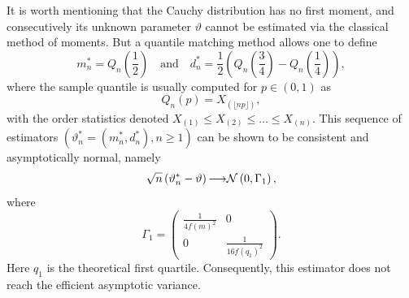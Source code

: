It is worth mentioning that the Cauchy distribution has no first moment, and consecutively its unknown parameter $\vartheta$ cannot be estimated via the classical method of moments. But a quantile matching method allows one to define
\begin{equation}
m^*_{n} = Q_n \left(\frac{1}{2}\right) \quad  \mbox{and} \quad d^*_n= \frac12 \left( Q_n \left(\frac{3}{4}\right) -Q_n \left(\frac{1}{4}\right) \right),
\end{equation}
where the sample quantile is usually computed for $p\in(0,1)$ as
$$
Q_n(p) = X_{(\lfloor np\rfloor)},
$$
with the order statistics denoted $X_{(1)} \leq X_{(2)} \leq \dots \leq  X_{(n)}$. 
This sequence of estimators $(\vartheta^*_n=(m^*_n,d^*_n), n \geq1)$ can be shown to be consistent and asymptotically normal, namely 
$$\sqrt{n}\left(\vartheta^*_n-\vartheta\right) {\longrightarrow} {\cal N} \left( 0, \Gamma_1\right),$$
where
\begin{equation}\label{cauchy1}
\Gamma_1= \begin{pmatrix}
\frac{1}{4 f(m)^2} & 0 \\
0 & \frac{1}{16 f(q_1)^2} 
\end{pmatrix}.
\end{equation}
Here $q_1$ is the theoretical first quartile. Consequently, this estimator does not reach the efficient asymptotic variance.



